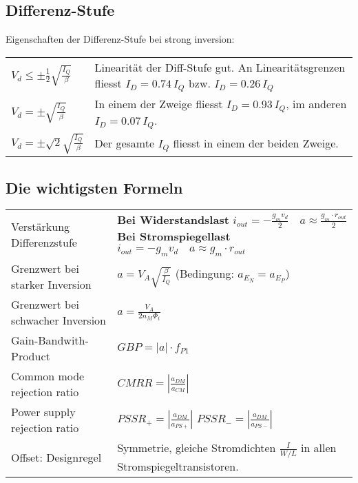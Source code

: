 \subsection{Differenz-Stufe}
Eigenschaften der Differenz-Stufe bei strong inversion:
\begin{table}[htbp]
	\centering
	\begin{tabularx}{0.7\linewidth}{lX}
		$V_d \leq \pm \frac{1}{2} \sqrt{\frac{I_Q}{\beta}}$ & Linearität der Diff-Stufe gut. An Linearitätsgrenzen fliesst $I_D = 0.74 \, I_Q$ bzw. $I_D = 0.26 \, I_Q$ \\
		$V_d = \pm \sqrt{\frac{I_Q}{\beta}}$ & In einem der Zweige fliesst $I_D = 0.93 \, I_Q$, im anderen \newline $I_D = 0.07 \, I_Q$. \\
		$V_d = \pm \sqrt{2} \sqrt{\frac{I_Q}{\beta}}$ & Der gesamte $I_Q$ fliesst in einem der beiden Zweige. \\
	\end{tabularx}
\end{table}

\subsection{Die wichtigsten Formeln}
\begin{tabular}{p{7cm}p{11cm}}
Verstärkung Differenzstufe &
\textbf{Bei Widerstandslast} $i_{out}=-\frac{g_mv_d}{2} \quad a\approx\frac{g_m\cdot r_{out}}{2}$ \newline
\textbf{Bei Stromspiegellast} $i_{out}=-g_mv_d \quad a\approx g_m\cdot r_{out}$
\\
Grenzwert bei starker Inversion & $a=V_A\sqrt{\frac{\beta}{I_Q}}$ (Bedingung:
$a_{E_N}=a_{E_P}$)\\
Grenzwert bei schwacher Inversion & $a=\frac{V_A}{2n_M\Phi_t}$\\
Gain-Bandwith-Product & $GBP=|a|\cdot f_{P1}$ \\
Common mode rejection ratio & $CMRR=\left| \frac{a_{DM}}{a_{CM}}\right|$\\
Power supply rejection ratio &
$PSSR_+ = \left| \frac{a_{DM}}{a_{PS+}}\right|$ \newline
$PSSR_- = \left| \frac{a_{DM}}{a_{PS-}}\right|$ \\
Offset: Designregel & Symmetrie, gleiche Stromdichten $\frac{I}{W/L}$ in
allen Stromspiegeltransistoren. \\
\end{tabular}


